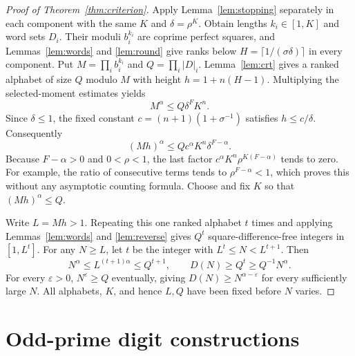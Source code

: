 \documentclass[11pt]{article}
\theoremstyle{definition}
\theoremstyle{remark}
\newcommand{\card}[1]{\lvert #1\rvert}
\begin{document}
\begin{proof}[Proof of Theorem~\ref{thm:criterion}]
Apply Lemma~\ref{lem:stopping} separately in each component with the same
$K$ and $\delta=\rho^K$. Obtain lengths $k_i\in[1,K]$ and word sets $D_i$.
Their moduli $b_i^{k_i}$ are coprime perfect squares, and
Lemmas~\ref{lem:words} and \ref{lem:round} give ranks below
$H=\lceil1/(\sigma\delta)\rceil$ in every component.
Put $M=\prod_ib_i^{k_i}$ and $Q=\prod_i\card D_i$.
Lemma~\ref{lem:crt} gives a ranked alphabet of size $Q$ modulo $M$ with
height $h=1+n(H-1)$. Multiplying the selected-moment estimates yields
\begin{equation}\label{eq:productmoment}
 M^\alpha\le Q\delta^F K^n.
\end{equation}
Since $\delta\le1$, the fixed constant $c=(n+1)(1+\sigma^{-1})$ satisfies
$h\le c/\delta$. Consequently
\[
 (Mh)^\alpha\le Qc^\alpha K^n\delta^{F-\alpha}.
\]
Because $F-\alpha>0$ and $0<\rho<1$, the last factor
$c^\alpha K^n\rho^{K(F-\alpha)}$ tends to zero.
For example, the ratio of consecutive terms tends to
$\rho^{F-\alpha}<1$, which proves this without any asymptotic counting
formula. Choose and fix $K$ so that $(Mh)^\alpha\le Q$.

Write $L=Mh>1$. Repeating this one ranked alphabet $t$ times and applying
Lemmas~\ref{lem:words} and \ref{lem:reverse} gives $Q^t$ square-difference-free
integers in $[1,L^t]$. For any $N\ge L$, let $t$ be the integer with
$L^t\le N<L^{t+1}$. Then
\[
 N^\alpha\le L^{(t+1)\alpha}\le Q^{t+1},\qquad
 D(N)\ge Q^t\ge Q^{-1}N^\alpha.
\]
For every $\varepsilon>0$, $N^\varepsilon\ge Q$ eventually, giving
$D(N)\ge N^{\alpha-\varepsilon}$ for every sufficiently large $N$.
All alphabets, $K$, and hence $L,Q$ have been fixed before $N$ varies.
\end{proof}

\section{Odd-prime digit constructions}\label{sec:odd}
\end{document}
